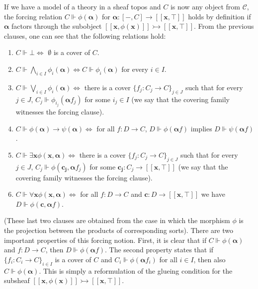 \documentclass[a4paper,11pt]{article}
\theoremstyle{plain}
\theoremstyle{plain}
\theoremstyle{remark}
\begin{document}
If we have a model of a theory in a sheaf topos and $C$ is now any object from $\mathcal{C}$, the forcing relation $C \Vdash \phi(\boldsymbol\alpha)$ for $\boldsymbol\alpha: [-, C] \to [\![\mathbf{x}, \top]\!]$ holds by definition if $\boldsymbol\alpha$ factors through the subobject $[\![\mathbf{x}, \phi(\mathbf{x})]\!] \rightarrowtail [\![\mathbf{x}, \top]\!]$. From the previous clauses, one can see that the following relations hold:

\begin{enumerate}
 \item $C \Vdash \bot \Leftrightarrow$ $\emptyset$ is a cover of $C$. 
 \item $C \Vdash \bigwedge_{i \in I} \phi_i(\boldsymbol\alpha) \Leftrightarrow C \Vdash \phi_i(\boldsymbol\alpha)$ for every $i \in I$.
 \item $C \Vdash \bigvee_{i \in I} \phi_i(\boldsymbol\alpha) \Leftrightarrow $ there is a cover $\{f_j: C_j \to C\}_{j \in J}$ such that for every $j \in J$, $C_j \Vdash \phi_{i_j}(\boldsymbol\alpha f_j)$ for some $i_j \in I$ (we say that the covering family witnesses the forcing clause).
 \item $C \Vdash \phi(\boldsymbol\alpha) \to \psi(\boldsymbol\alpha) \Leftrightarrow $ for all $f: D \to C$, $D \Vdash \phi(\boldsymbol\alpha f)$ implies $D \Vdash \psi(\boldsymbol\alpha f)$.
 \item $C \Vdash \exists \mathbf{x}\phi(\mathbf{x}, \boldsymbol\alpha) \Leftrightarrow $ there is a cover $\{f_j: C_j \to C\}_{j \in J}$ such that for every $j \in J$, $C_j \Vdash \phi(\mathbf{c_j}, \boldsymbol\alpha f_j)$ for some $\mathbf{c_j}: C_{j} \to [\![\mathbf{x}, \top]\!]$ (we say that the covering family witnesses the forcing clause).
 \item $C \Vdash \forall \mathbf{x}\phi(\mathbf{x}, \boldsymbol\alpha) \Leftrightarrow $ for all $f: D \to C$ and $\mathbf{c}: D \to [\![\mathbf{x}, \top]\!]$ we have $D \Vdash \phi(\mathbf{c}, \boldsymbol\alpha f)$.
\end{enumerate}

(These last two clauses are obtained from the case in which the morphism $\phi$ is the projection between the products of corresponding sorts). There are two important properties of this forcing notion. First, it is clear that if $C \Vdash \phi(\boldsymbol\alpha)$ and $f: D \to C$, then $D \Vdash \phi(\boldsymbol\alpha f)$. The second property states that if $\{f_i: C_i \to C\}_{i \in I}$ is a cover of $C$ and $C_i \Vdash \phi(\boldsymbol\alpha f_i)$ for all $i \in I$, then also $C \Vdash \phi(\boldsymbol\alpha)$. This is simply a reformulation of the glueing condition for the subsheaf $[\![\mathbf{x}, \phi(\mathbf{x})]\!] \rightarrowtail [\![\mathbf{x}, \top]\!]$.
\end{document}
